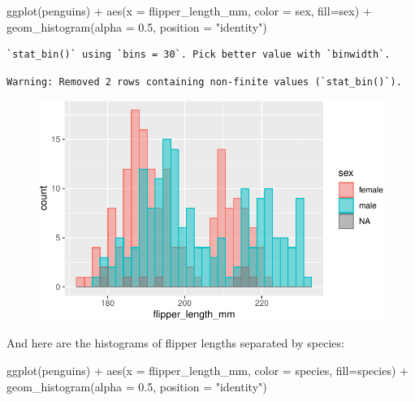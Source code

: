 \documentclass[
  letterpaper,
  DIV=11,
  numbers=noendperiod]{scrreprt}
\newenvironment{Shaded}{\begin{snugshade}}{\end{snugshade}}
\newcommand{\AttributeTok}[1]{\textcolor[rgb]{0.40,0.45,0.13}{#1}}
\newcommand{\FloatTok}[1]{\textcolor[rgb]{0.68,0.00,0.00}{#1}}
\newcommand{\FunctionTok}[1]{\textcolor[rgb]{0.28,0.35,0.67}{#1}}
\newcommand{\NormalTok}[1]{\textcolor[rgb]{0.00,0.23,0.31}{#1}}
\newcommand{\SpecialCharTok}[1]{\textcolor[rgb]{0.37,0.37,0.37}{#1}}
\newcommand{\StringTok}[1]{\textcolor[rgb]{0.13,0.47,0.30}{#1}}
\begin{document}
\begin{Shaded}
\begin{Highlighting}[]
\FunctionTok{ggplot}\NormalTok{(penguins) }\SpecialCharTok{+}
  \FunctionTok{aes}\NormalTok{(}\AttributeTok{x =}\NormalTok{ flipper\_length\_mm, }\AttributeTok{color =}\NormalTok{ sex, }\AttributeTok{fill=}\NormalTok{sex) }\SpecialCharTok{+} \FunctionTok{geom\_histogram}\NormalTok{(}\AttributeTok{alpha =} \FloatTok{0.5}\NormalTok{, }\AttributeTok{position =} \StringTok{"identity"}\NormalTok{)}
\end{Highlighting}
\end{Shaded}

\begin{verbatim}
`stat_bin()` using `bins = 30`. Pick better value with `binwidth`.
\end{verbatim}

\begin{verbatim}
Warning: Removed 2 rows containing non-finite values (`stat_bin()`).
\end{verbatim}

\begin{figure}[H]

{\centering \includegraphics{./04-distributions_files/figure-pdf/unnamed-chunk-18-1.pdf}

}

\end{figure}

And here are the histograms of flipper lengths separated by species:

\begin{Shaded}
\begin{Highlighting}[]
\FunctionTok{ggplot}\NormalTok{(penguins) }\SpecialCharTok{+}
  \FunctionTok{aes}\NormalTok{(}\AttributeTok{x =}\NormalTok{ flipper\_length\_mm, }\AttributeTok{color =}\NormalTok{ species, }\AttributeTok{fill=}\NormalTok{species) }\SpecialCharTok{+} \FunctionTok{geom\_histogram}\NormalTok{(}\AttributeTok{alpha =} \FloatTok{0.5}\NormalTok{, }\AttributeTok{position =} \StringTok{"identity"}\NormalTok{)}
\end{Highlighting}
\end{Shaded}
\end{document}
